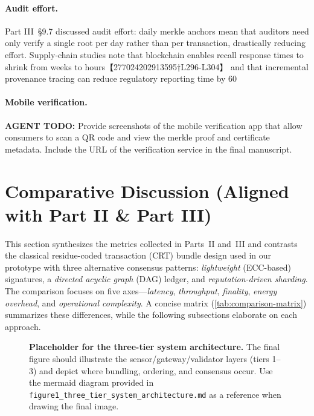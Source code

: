 \documentclass[12pt,onecolumn]{IEEEtran} %
\begin{document}
\paragraph{Audit effort.}
Part III~\S9.7 discussed audit effort: daily merkle anchors mean that auditors need only verify a single root per day rather than per transaction, drastically reducing effort.  Supply‑chain studies note that blockchain enables recall response times to shrink from weeks to hours【277024202913595†L296-L304】 and that incremental provenance tracing can reduce regulatory reporting time by 60 %

\paragraph{Mobile verification.}
\textbf{AGENT TODO:} Provide screenshots of the mobile verification app that allow consumers to scan a QR code and view the merkle proof and certificate metadata.  Include the URL of the verification service in the final manuscript.


\section{Comparative Discussion (Aligned with Part II \& Part III)}
\label{sec:comparative-discussion}

This section synthesizes the metrics collected in Parts~II and~III and contrasts the classical residue-coded transaction (CRT) bundle design used in our prototype with three alternative consensus patterns: \emph{lightweight} (ECC-based) signatures, a \emph{directed acyclic graph} (DAG) ledger, and \emph{reputation-driven sharding}. The comparison focuses on five axes—\emph{latency}, \emph{throughput}, \emph{finality}, \emph{energy overhead}, and \emph{operational complexity}. A concise matrix (\autoref{tab:comparison-matrix}) summarizes these differences, while the following subsections elaborate on each approach.

\begin{figure}[h]
  \centering
  \caption{\textbf{Placeholder for the three-tier system architecture.} The final figure should illustrate the sensor/gateway/validator layers (tiers 1–3) and depict where bundling, ordering, and consensus occur. Use the mermaid diagram provided in \texttt{figure1\_three\_tier\_system\_architecture.md} as a reference when drawing the final image.}
  \label{fig:three-tier-architecture}
\end{figure}
\end{document}
